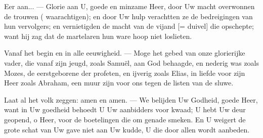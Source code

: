 \documentclass[12pt,twoside,a5paper]{article}
\begin{document}
\begin{halfparskip}
  Eer aan... --- Glorie aan U, goede en minzame Heer, door Uw macht overwonnen de trouwen ( waarachtigen); en door Uw hulp verachtten ze de bedreigingen van hun vervolgers; en vernietigden de macht van de vijand [= duivel] die opschepte; want hij zag dat de martelaren hun ware hoop niet loslieten.

  Vanaf het begin en in alle eeuwigheid. --- Moge het gebed van onze glorierijke vader, die vanaf zijn jeugd, zoals Samuël, aan God behaagde, en nederig was zoals Mozes, de eerstgeborene der profeten, en ijverig zoals Elias, in liefde voor zijn Heer zoals Abraham, een muur zijn voor ons tegen de listen van de sluwe.

  Laat al het volk zeggen: amen en amen. --- We belijden Uw Godheid, goede Heer, want in Uw goedheid behoedt U Uw aanbidders voor kwaad; U hebt Uw deur geopend, o Heer, voor de boetelingen die om genade smeken. En U weigert de grote schat van Uw gave niet aan Uw kudde, U die door allen wordt aanbeden.
\end{halfparskip}
\end{document}
